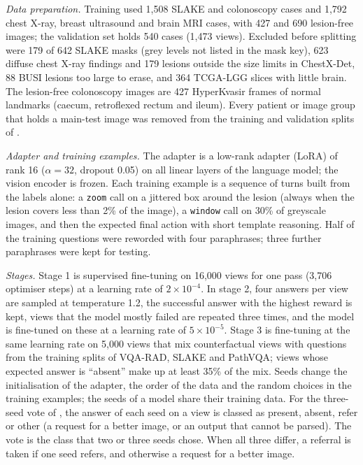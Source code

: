 \emph{Data preparation.} Training used 1,508 SLAKE and colonoscopy cases and 1,792 chest X-ray, breast ultrasound and brain MRI cases, with 427 and 690 lesion-free images; the validation set holds 540 cases (1,473 views). Excluded before splitting were 179 of 642 SLAKE masks (grey levels not listed in the mask key), 623 diffuse chest X-ray findings and 179 lesions outside the size limits in ChestX-Det, 88 BUSI lesions too large to erase, and 364 TCGA-LGG slices with little brain. The lesion-free colonoscopy images are 427 HyperKvasir frames of normal landmarks (caecum, retroflexed rectum and ileum). Every patient or image group that holds a main-test image was removed from the training and validation splits of \ms.

\emph{Adapter and training examples.} The adapter is a low-rank adapter (LoRA) \citep{hu2022lora} of rank 16 ($\alpha = 32$, dropout 0.05) on all linear layers of the language model; the vision encoder is frozen. Each training example is a sequence of turns built from the labels alone: a \texttt{zoom} call on a jittered box around the lesion (always when the lesion covers less than 2\% of the image), a \texttt{window} call on 30\% of greyscale images, and then the expected final action with short template reasoning. Half of the training questions were reworded with four paraphrases; three further paraphrases were kept for testing.

\emph{Stages.} Stage 1 is supervised fine-tuning on 16,000 views for one pass (3,706 optimiser steps) at a learning rate of $2 \times 10^{-4}$. In stage 2, four answers per view are sampled at temperature 1.2, the successful answer with the highest reward is kept, views that the model mostly failed are repeated three times, and the model is fine-tuned on these at a learning rate of $5 \times 10^{-5}$. Stage 3 is fine-tuning at the same learning rate on 5,000 views that mix counterfactual views with questions from the training splits of VQA-RAD, SLAKE and PathVQA; views whose expected answer is ``absent'' make up at least 35\% of the mix. Seeds change the initialisation of the adapter, the order of the data and the random choices in the training examples; the seeds of a model share their training data. For the three-seed vote of \msn, the answer of each seed on a view is classed as present, absent, refer or other (a request for a better image, or an output that cannot be parsed). The vote is the class that two or three seeds chose. When all three differ, a referral is taken if one seed refers, and otherwise a request for a better image.

